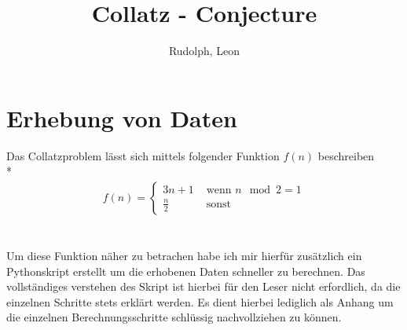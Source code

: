 \documentclass{article}
\title{Collatz - Conjecture}
\author{Rudolph, Leon}
\date
\begin{document}
\maketitle

\newpage

\section{Erhebung von Daten}
Das Collatzproblem lässt sich mittels folgender Funktion $f(n)$ beschreiben \\*
\begin{align*}
f(n)=
\begin{cases}
3n+1 & \text{ wenn } n \mod 2 = 1 \\
\frac{n}{2} & \text{ sonst }
\end{cases}  
\end{align*}
\\\\
\noindent Um diese Funktion näher zu betrachen habe ich mir hierfür zusätzlich ein Pythonskript erstellt um die erhobenen Daten schneller zu berechnen. Das vollständiges verstehen des Skript ist hierbei für den Leser nicht erfordlich, da die einzelnen Schritte stets erklärt werden. Es dient hierbei lediglich als Anhang um die einzelnen Berechnungsschritte schlüssig nachvollziehen zu können.
\end{document}
